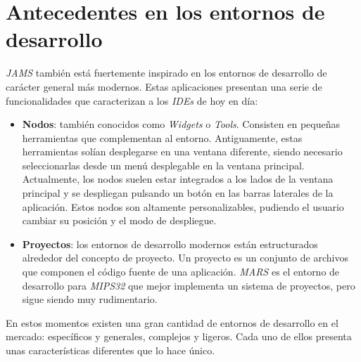 \section{Antecedentes en los entornos de desarrollo}
\label{sec:antecedentes-en-los-entornos-de-desarrollo}

\textit{JAMS} también está fuertemente inspirado en los
entornos de desarrollo de carácter general más modernos.
Estas aplicaciones presentan una serie de funcionalidades que
caracterizan a los \textit{IDEs} de hoy en día:

\begin{itemize}
    \item \textbf{Nodos}: también conocidos como \textit{Widgets} o \textit{Tools}.
    Consisten en pequeñas herramientas que complementan al entorno.
    Antiguamente, estas herramientas solían desplegarse en una ventana diferente,
    siendo necesario seleccionarlas desde un menú desplegable en la ventana principal.
    Actualmente, los nodos suelen estar integrados a los lados de la ventana principal
    y se despliegan pulsando un botón en las barras laterales
    de la aplicación.
    Estos nodos son altamente personalizables, pudiendo el usuario cambiar su posición
    y el modo de despliegue.
    \item \textbf{Proyectos}: los entornos de desarrollo modernos están estructurados
    alrededor del concepto de proyecto.
    Un proyecto es un conjunto de archivos que componen el código fuente de una aplicación.
    \textit{MARS} es el entorno de desarrollo para \textit{MIPS32} que mejor implementa
    un sistema de proyectos, pero sigue siendo muy rudimentario.
\end{itemize}

En estos momentos existen una gran cantidad de entornos de desarrollo en el mercado:
específicos y generales, complejos y ligeros.
Cada uno de ellos presenta unas características diferentes que lo hace único.

